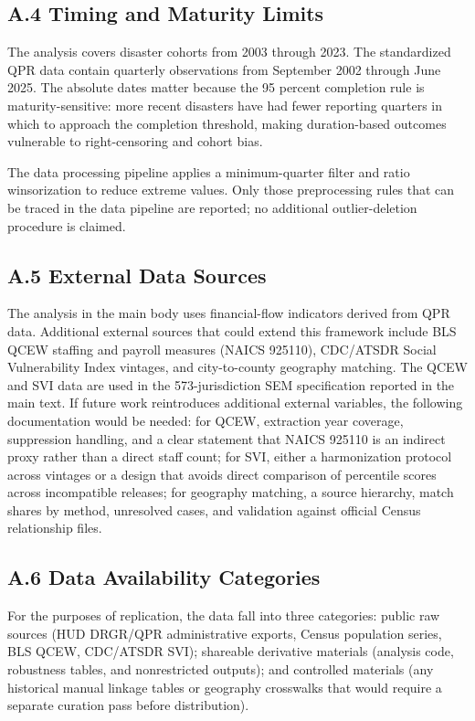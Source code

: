 \documentclass[
  number]{elsarticle}
\begin{document}
\subsection{A.4 Timing and Maturity
Limits}\label{a.4-timing-and-maturity-limits}

The analysis covers disaster cohorts from 2003 through 2023. The
standardized QPR data contain quarterly observations from September 2002
through June 2025. The absolute dates matter because the 95 percent
completion rule is maturity-sensitive: more recent disasters have had
fewer reporting quarters in which to approach the completion threshold,
making duration-based outcomes vulnerable to right-censoring and cohort
bias.

The data processing pipeline applies a minimum-quarter filter and ratio
winsorization to reduce extreme values. Only those preprocessing rules
that can be traced in the data pipeline are reported; no additional
outlier-deletion procedure is claimed.

\subsection{A.5 External Data Sources}\label{a.5-external-data-sources}

The analysis in the main body uses financial-flow indicators derived
from QPR data. Additional external sources that could extend this
framework include BLS QCEW staffing and payroll measures (NAICS 925110),
CDC/ATSDR Social Vulnerability Index vintages, and city-to-county
geography matching. The QCEW and SVI data are used in the
573-jurisdiction SEM specification reported in the main text. If future
work reintroduces additional external variables, the following
documentation would be needed: for QCEW, extraction year coverage,
suppression handling, and a clear statement that NAICS 925110 is an
indirect proxy rather than a direct staff count; for SVI, either a
harmonization protocol across vintages or a design that avoids direct
comparison of percentile scores across incompatible releases; for
geography matching, a source hierarchy, match shares by method,
unresolved cases, and validation against official Census relationship
files.

\subsection{A.6 Data Availability
Categories}\label{a.6-data-availability-categories}

For the purposes of replication, the data fall into three categories:
public raw sources (HUD DRGR/QPR administrative exports, Census
population series, BLS QCEW, CDC/ATSDR SVI); shareable derivative
materials (analysis code, robustness tables, and nonrestricted outputs);
and controlled materials (any historical manual linkage tables or
geography crosswalks that would require a separate curation pass before
distribution).
\end{document}
